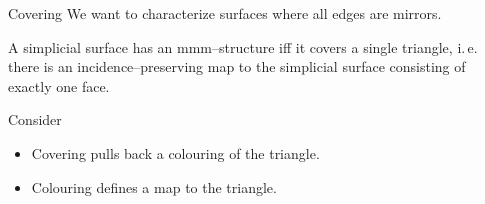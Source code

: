 \begin{frame}{Covering}
    \pause
    We want to characterize surfaces where all edges are mirrors.
    \pause
    \begin{lem}
        A simplicial surface has an mmm--structure iff it covers a 
        single triangle\pause, i.\,e. there is an incidence--preserving
        map to the simplicial surface consisting of exactly one face.
    \end{lem}
    \pause
    Consider
        \begin{center}
        \end{center}
    \begin{itemize}
        \pause
        \item Covering pulls back a colouring of the triangle.
        \pause
        \item Colouring defines a map to the triangle.
    \end{itemize}
\end{frame}


